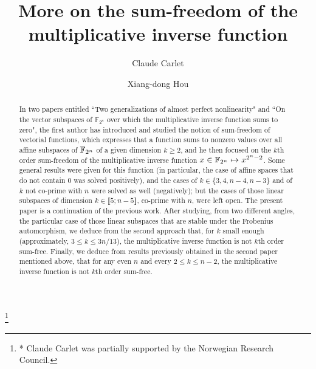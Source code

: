 \documentclass{amsart}
\numberwithin{equation}{section}
\theoremstyle{definition}
\newcommand{\f}{\Bbb F}
\begin{document}
\title{More on the sum-freedom of the multiplicative inverse function}

\author[Claude Carlet]{Claude Carlet}
\address{Department of Mathematics,
University Paris 8, 93526 Saint-Denis France and Department of Informatics, University of Bergen, 5005 Bergen Norway}
\thanks{* Claude Carlet was partially supported by the Norwegian Research Council.}
\author[Xiang-dong Hou]{Xiang-dong Hou}
\address{Department of Mathematics and Statistics,
University of South Florida, Tampa, FL 33620}




\begin{abstract}
In two papers entitled ``Two generalizations of almost perfect nonlinearity" and ``On the vector subspaces of $\mathbb F_{2^n}$ over which the multiplicative inverse function sums to zero", the first author has introduced and studied the notion of sum-freedom of vectorial functions, which expresses that a function sums to nonzero values over all affine subspaces of $\f_{2^n}$ of a given dimension $k\geq 2$, and he then focused on the $k$th order sum-freedom of the multiplicative inverse function $x\in \f_{2^n}\mapsto x^{2^n-2}$. Some general results were given for this function (in particular, the case of affine spaces that do not contain 0 was solved positively), and the cases of $k\in \{3,4,n-4,n-3\}$ and of $k$ not co-prime with $n$ were solved as well (negatively); but the cases of those linear subspaces of dimension $k\in \llbracket 5;n-5\rrbracket$, co-prime with $n$, were left open. The present paper is a continuation of the previous work. After studying, from two different angles, the particular case of those linear subspaces that are stable under the Frobenius automorphism, we deduce from the second approach that, for $k$ small enough (approximately, $3\le k\leq 3n/13$), the multiplicative inverse function is not $k$th order sum-free. Finally, we deduce from results previously obtained in the second paper mentioned above, that for any even $n$ and every $2\leq k\leq n-2$, the multiplicative inverse function is not $k$th order sum-free.
\end{abstract}

\maketitle
\end{document}
